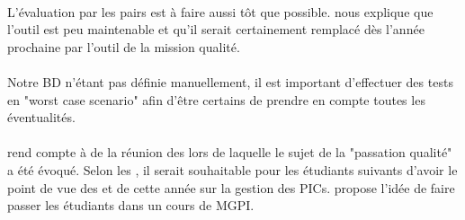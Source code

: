 \documentclass [a4paper] {article}
\begin{document}
\paragraph*{}
L'évaluation par les pairs est à faire aussi tôt que possible. \nomTuteurQualite{} nous explique que l'outil est peu maintenable et qu'il serait certainement remplacé dès l'année prochaine par l'outil de la mission qualité.

\paragraph*{}
Notre BD n'étant pas définie manuellement, il est important d'effectuer des tests en "worst case scenario" afin d'être certains de prendre en compte toutes les éventualités.

\paragraph*{}
\Pierre{} rend compte à \nomTuteurQualite{} de la réunion des \RQ{} lors de laquelle le sujet de la "passation qualité" a été évoqué. Selon les \RQCourt{}, il serait souhaitable pour les étudiants suivants d'avoir le point de vue des \RQ{} et \CP{} de cette année sur la gestion des PICs. \nomTuteurQualite{} propose l'idée de faire passer les étudiants dans un cours de MGPI.
\end{document}
